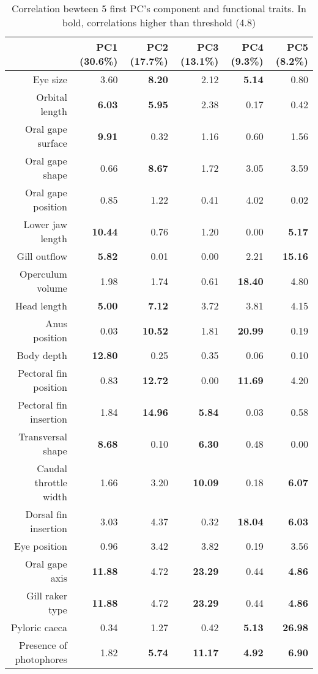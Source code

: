 \begin{table}[ht]
\centering
\caption{Correlation bewteen 5 first PC's component and functional traits. In bold, correlations higher than threshold (4.8)}
\label{table:cont_abs}
\begin{adjustbox}{max width=1.1\textwidth,center}
\begin{tabular}{rrrrrr}
  \hline
 & PC1 (30.6\%) & PC2 (17.7\%) & PC3 (13.1\%) & PC4 (9.3\%) & PC5 (8.2\%) \\ 
  \hline
Eye size & 3.60 & \textbf{8.20} & 2.12 & \textbf{5.14} & 0.80 \\ 
  Orbital length & \textbf{6.03} & \textbf{5.95} & 2.38 & 0.17 & 0.42 \\ 
  Oral gape surface & \textbf{9.91} & 0.32 & 1.16 & 0.60 & 1.56 \\ 
  Oral gape shape & 0.66 & \textbf{8.67} & 1.72 & 3.05 & 3.59 \\ 
  Oral gape position & 0.85 & 1.22 & 0.41 & 4.02 & 0.02 \\ 
  Lower jaw length & \textbf{10.44} & 0.76 & 1.20 & 0.00 & \textbf{5.17} \\ 
  Gill outflow & \textbf{5.82} & 0.01 & 0.00 & 2.21 & \textbf{15.16} \\ 
  Operculum volume & 1.98 & 1.74 & 0.61 & \textbf{18.40} & 4.80 \\ 
  Head length & \textbf{5.00} & \textbf{7.12} & 3.72 & 3.81 & 4.15 \\ 
  Anus position & 0.03 & \textbf{10.52} & 1.81 & \textbf{20.99} & 0.19 \\ 
  Body depth & \textbf{12.80} & 0.25 & 0.35 & 0.06 & 0.10 \\ 
  Pectoral fin position & 0.83 & \textbf{12.72} & 0.00 & \textbf{11.69} & 4.20 \\ 
  Pectoral fin insertion & 1.84 & \textbf{14.96} & \textbf{5.84} & 0.03 & 0.58 \\ 
  Transversal shape & \textbf{8.68} & 0.10 & \textbf{6.30} & 0.48 & 0.00 \\ 
  Caudal throttle width & 1.66 & 3.20 & \textbf{10.09} & 0.18 & \textbf{6.07} \\ 
  Dorsal fin insertion & 3.03 & 4.37 & 0.32 & \textbf{18.04} & \textbf{6.03} \\ 
  Eye position & 0.96 & 3.42 & 3.82 & 0.19 & 3.56 \\ 
  Oral gape axis & \textbf{11.88} & 4.72 & \textbf{23.29} & 0.44 & \textbf{4.86} \\
  Gill raker type & \textbf{11.88} & 4.72 & \textbf{23.29} & 0.44 & \textbf{4.86} \\ 
  Pyloric caeca & 0.34 & 1.27 & 0.42 & \textbf{5.13} & \textbf{26.98} \\ 
  Presence of photophores & 1.82 & \textbf{5.74} & \textbf{11.17} & \textbf{4.92} & \textbf{6.90} \\ 
   \hline
\end{tabular}
\end{adjustbox}
\end{table}

